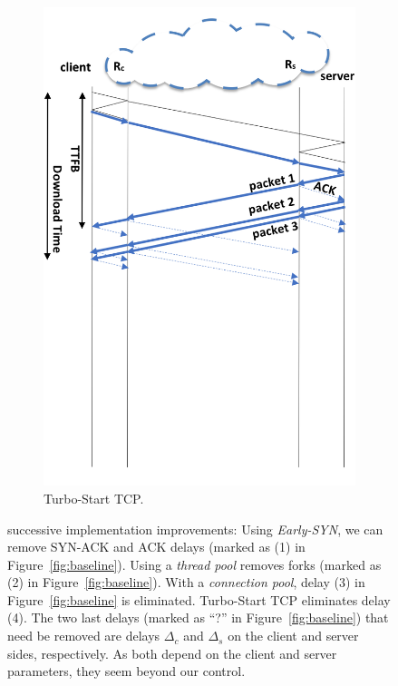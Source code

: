 \begin{figure}[!t]
\begin{subfigure}{0.48\columnwidth}
  \includegraphics[width=\columnwidth]{figures/turbo.png}
    \caption{Turbo-Start TCP.} \label{fig:turbo-start-tcp}
\end{subfigure}
    \caption{\oursys successive implementation improvements: Using \textit{Early-SYN}, we can remove SYN-ACK and ACK delays (marked as (1) in Figure~\ref{fig:baseline}). Using a \textit{thread pool} removes forks (marked as (2) in Figure~\ref{fig:baseline}). With a \textit{connection pool}, delay (3) in Figure~\ref{fig:baseline} is eliminated. Turbo-Start TCP eliminates delay (4). The two last delays (marked as ``?'' in Figure~\ref{fig:baseline}) that need be removed are delays $\Delta_c$ and $\Delta_s$ on the client and server sides, respectively. As both depend on the client and server parameters, they seem beyond our control. 
    }
    \label{fig:oursys-improvements}
\end{figure}

